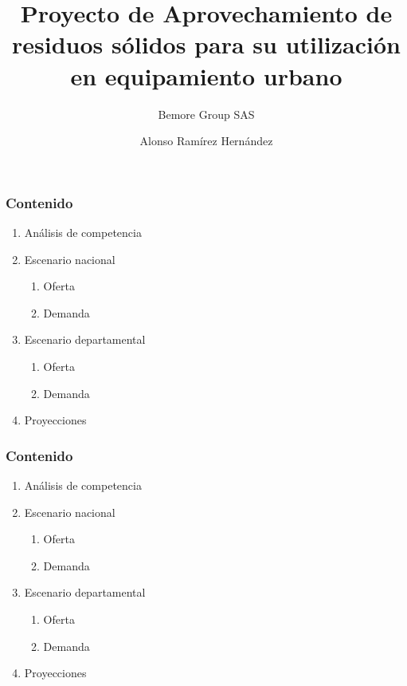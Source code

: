 \documentclass[10pt]{beamer}
\author[Alonso Ramírez Hernández]{Alonso Ramírez Hernández}
\institute[]{Asesor en proyectos}
\title[Proyecto VISOTA]{Proyecto de Aprovechamiento de residuos sólidos para su utilización en equipamiento urbano}
\subtitle{Bemore Group SAS}
\begin{document}
\begin{frame}
\titlepage
\end{frame}



\begin{frame}
\frametitle{Contenido}
\begin{enumerate}
\item Análisis de competencia 
\item  Escenario nacional
\begin{enumerate} [a]
\item Oferta
\item Demanda
\end{enumerate}
\item Escenario departamental
\begin{enumerate} [a]
\item Oferta
\item Demanda
\end{enumerate}
\item Proyecciones
\end{enumerate}
\end{frame}


\begin{frame}
\frametitle{Contenido}
\begin{enumerate}[<i->]
\item<1-> Análisis de competencia 
\item  Escenario nacional
\begin{enumerate} [a]
\item Oferta
\item Demanda
\end{enumerate}
\item Escenario departamental
\begin{enumerate} [a]
\item Oferta
\item Demanda
\end{enumerate}
\item Proyecciones
\end{enumerate}
\end{frame}
\end{document}
